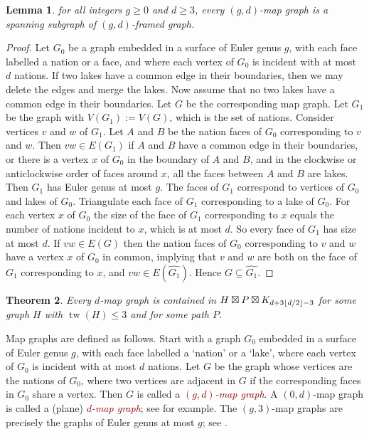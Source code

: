 \documentclass{patmorin}
\theoremstyle{plain}
\newtheorem{thm}{Theorem}
\newtheorem{lem}[thm]{Lemma}
\theoremstyle{definition}
\newcommand{\defin}[1]{\textcolor{Maroon}{\emph{#1}}}
\DeclareMathOperator{\tw}{tw}
\DeclarePairedDelimiter{\floor}{\lfloor}{\rfloor}
\renewcommand{\geq}{\geqslant}
\renewcommand{\leq}{\leqslant}
\begin{document}
\begin{lem}
\label{MewMapGraphLemma}
for all integers $g\geq 0$ and $d\geq 3$, every $(g,d)$-map graph is a spanning subgraph of  $(g,d)$-framed graph.
\end{lem}

\begin{proof}
Let $G_0$ be a graph embedded in a surface of Euler genus $g$, with each face labelled a nation or a face, and where each vertex of $G_0$ is incident with at most $d$ nations. If two lakes have a common edge in their boundaries, then we may delete the edges and merge the lakes. Now assume that no two lakes have a common edge in their boundaries.
Let $G$ be the corresponding map graph.
Let $G_1$ be the graph with $V(G_1):=V(G)$, which is the set of nations.
Consider vertices $v$ and $w$ of $G_1$.
Let $A$ and $B$ be the nation faces of $G_0$ corresponding to $v$ and $w$.
Then $vw\in E(G_1)$ if $A$ and $B$ have a common edge in their boundaries,
or there is a vertex $x$ of $G_0$ in the boundary of $A$ and $B$, and in the clockwise or anticlockwise order of faces around $x$, all the faces between $A$ and $B$ are lakes.
Then $G_1$ has Euler genus at most $g$.
The faces of $G_1$ correspond to vertices of $G_0$ and lakes of $G_0$.
Triangulate each face of $G_1$ corresponding to a lake of $G_0$. For each vertex
$x$ of $G_0$ the size of the face of $G_1$ corresponding to $x$ equals the number of nations incident to $x$, which is at most $d$.
So every face of $G_1$ has size at most $d$.
If $vw\in E(G)$ then the nation faces of $G_0$ corresponding to $v$ and $w$ have a vertex $x$ of $G_0$ in common, implying that  $v$ and $w$ are both on the face of $G_1$ corresponding to $x$, and $vw\in E(\widehat{G_1})$. Hence $G\subseteq \widehat{G_1}$.
\end{proof}

\begin{thm}
\label{NewMapGraph}
Every $d$-map graph is contained in $H \boxtimes P \boxtimes K_{ d + 3\floor{d/2} -3 }$ for some graph $H$ with $\tw(H) \leq 3$ and for some path $P$.
\end{thm}

Map graphs are defined as follows. Start with a graph $G_0$ embedded in a surface of Euler genus $g$, with each face labelled a `nation' or a `lake', where each vertex of $G_0$ is incident with at most $d$ nations. Let $G$ be the graph whose vertices are the nations of $G_0$, where two vertices are adjacent in $G$ if the corresponding faces in $G_0$ share a vertex. Then $G$ is called a \defin{$(g,d)$-map graph}.  A $(0,d)$-map graph is called a (plane) \defin{$d$-map graph}; see \citep{FLS-SODA12,CGP02} for example.
The $(g,3)$-map graphs are precisely the graphs of Euler genus at most $g$; see \citep{dujmovic.eppstein.ea:structure}.
\end{document}
